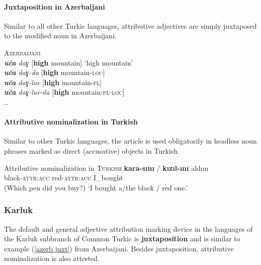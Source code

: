 \paragraph{Juxtaposition in Azerbaijani} Similar to all other Turkic languages, attributive adjectives are simply juxtaposed to the modified noun in Azerbaijani.
\begin{exe}
\ex \textsc{Azerbaijani} \citep[59–60]{siraliev-etal1971}\\
\textit{\textbf{uča} daɣ} [\textbf{high} mountain] ‘high mountain’\\
\textit{\textbf{uča} daɣ-da} [\textbf{high} mountain-\textsc{loc}]\\
\textit{\textbf{uča} daɣ-lar} [\textbf{high} mountain-\textsc{pl}]\\
\textit{\textbf{uča} daɣ-lar-da} [\textbf{high} mountain-\textsc{pl}-\textsc{loc}]\\
\dots \label{azerb juxt}
\end{exe}

\paragraph{Attributive nominalization in Turkish} \label{turkish synchr}
Similar to other Turkic languages, the article is used obligatorily in headless noun phrases marked as direct (accusative) objects in Turkish. 

\begin{exe}
\ex Attributive nominalization in \textsc{Turkish} \citep[7]{benzing1993b} \label{turkish headless acc}	
\gll	\textbf{kara-sını} / \textbf{kızıl-ını} aldım\\
 	black-\textsc{attr:acc} { } red-\textsc{attr:acc} I\_bought\\
\glt 	(Which pen did you buy?) ‘I bought a/the black / red one.’
\end{exe}
 
\subsubsection{Karluk}
The default and general adjective attribution marking device in the languages of the Karluk subbranch of Common Turkic is \textbf{juxtaposition} and is similar to example (\ref{azerb juxt}) from Azerbaijani. Besides juxtaposition, attributive nominalization is also attested.

